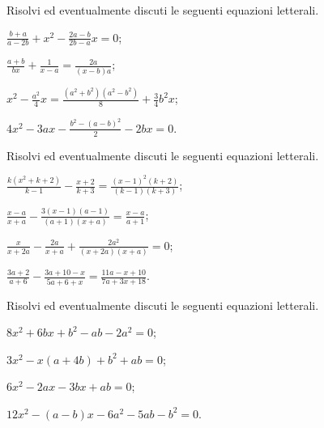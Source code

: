 \begin{esercizio}[\Ast]
 \label{ese:3.66} %
Risolvi ed eventualmente discuti le seguenti equazioni letterali.
\begin{multicols}{2}
\begin{enumeratea}
\item $\frac{b+a}{a-2b}+x^{2}-\frac{2a-b}{2b-a}x=0$;
\item $\frac{a+b}{bx}+\frac{1}{x-a}=\frac{2a}{(x-b)a}$;
\item $x^{2}-\frac{a^{2}}{4}x=\frac{\left(a^{2}+b^{2}\right)\left(a^{2}-b^{2}\right)}{8}+\frac{3}{4}b^{2}x$;
\item $4x^{2}-3ax-\frac{b^{2}-(a-b)^{2}}{2}-2bx=0$.
\end{enumeratea}
\end{multicols}
\end{esercizio}
\pagebreak
\begin{esercizio}[\Ast]
 \label{ese:3.67} %
Risolvi ed eventualmente discuti le seguenti equazioni letterali.
\begin{multicols}{2}
\begin{enumeratea}
\item $\frac{k\left(x^{2}+k+2\right)}{k-1}-\frac{x+2}{k+3}=\frac{(x-1)^{2}(k+2)}{(k-1)(k+3)}$;
\item $\frac{x-a}{x+a}-\frac{3(x-1)(a-1)}{(a+1)(x+a)}=\frac{x-a}{a+1}$;
\item $\frac{x}{x+2a}-\frac{2a}{x+a}+\frac{2a^{2}}{(x+2a)(x+a)}=0$;
\item $\frac{3a+2}{a+6}-\frac{3a+10-x}{5a+6+x}=\frac{11a-x+10}{7a+3x+18}$.
\end{enumeratea}
\end{multicols}
\end{esercizio}

\begin{esercizio}[\Ast]
 \label{ese:3.68} %
Risolvi ed eventualmente discuti le seguenti equazioni letterali.
\begin{multicols}{2}
\begin{enumeratea}
\item $8x^{2}+6bx+b^{2}-ab-2a^{2}=0$;
\item $3x^{2}-x(a+4b)+b^{2}+ab=0$;
\item $6x^{2}-2ax-3bx+ab=0$;
\item $12x^{2}-(a-b)x-6a^{2}-5ab-b^{2}=0$.
\end{enumeratea}
\end{multicols}
\end{esercizio}

